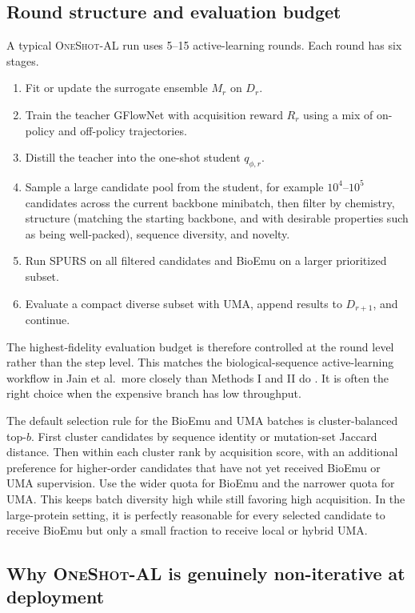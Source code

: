 \documentclass[11pt]{article}
\newcommand{\methodIII}{\textsc{OneShot-AL}}
\begin{document}
\subsection{Round structure and evaluation budget}

A typical \methodIII{} run uses 5--15 active-learning rounds. Each round has six stages.
\begin{enumerate}[leftmargin=1.5em]
    \item Fit or update the surrogate ensemble $M_r$ on $D_r$.
    \item Train the teacher GFlowNet with acquisition reward $R_r$ using a mix of on-policy and off-policy trajectories.
    \item Distill the teacher into the one-shot student $q_{\phi,r}$.
    \item Sample a large candidate pool from the student, for example $10^4$--$10^5$ candidates across the current backbone minibatch, then filter by chemistry, structure (matching the starting backbone, and with desirable properties such as being well-packed), sequence diversity, and novelty.
    \item Run SPURS on all filtered candidates and BioEmu on a larger prioritized subset.
    \item Evaluate a compact diverse subset with UMA, append results to $D_{r+1}$, and continue.
\end{enumerate}
The highest-fidelity evaluation budget is therefore controlled at the round level rather than the step level. This matches the biological-sequence active-learning workflow in Jain et al.~more closely than Methods I and II do \citep{jain2022bioseqgfn}. It is often the right choice when the expensive branch has low throughput.

The default selection rule for the BioEmu and UMA batches is cluster-balanced top-$b$. First cluster candidates by sequence identity or mutation-set Jaccard distance. Then within each cluster rank by acquisition score, with an additional preference for higher-order candidates that have not yet received BioEmu or UMA supervision. Use the wider quota for BioEmu and the narrower quota for UMA. This keeps batch diversity high while still favoring high acquisition. In the large-protein setting, it is perfectly reasonable for every selected candidate to receive BioEmu but only a small fraction to receive local or hybrid UMA.

\subsection{Why \methodIII{} is genuinely non-iterative at deployment}
\end{document}
